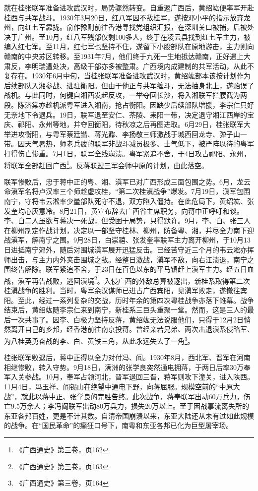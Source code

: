 就在桂张联军准备进攻武汉时，局势骤然转变。自重返广西后，黄绍竑便率军开赴桂西与共军战斗。1930年3月20日，红八军因不敌桂军，遂按邓小平的指示放弃龙州，向红七军靠拢。俞作豫则前往香港寻找党组织汇报，在深圳关口被捕，后被处决于广州。至10月，红八军残部仅剩100多人，终于在凌云县找到红七军主力，被编入红七军。至11月，红七军也坚持不住，遂留下小股部队在原地游击，主力则向赣南的中央苏区转移。至1931年7月，他们终于九死一生地抵达赣南，正好遇上大肃反，李明瑞遭处决，高级干部亦多被整肃。广西境内成建制的共军活动，从此不复存在。1930年6月中旬，当桂张联军准备进攻武汉时，黄绍竑部本该按计划作为后续部队入湘参战、进驻衡阳。但由于他正与共军缠斗，无法抽身北上，遂贻误了战机。与此同时，何键自湘西发起反攻，一举夺回长沙，将入湘联军拦腰截为两段。陈济棠亦趁机派粤军进入湘南，抢占衡阳。因缺少后续部队增援，李宗仁只好无奈地下令退兵。19日，联军退至安仁、茶陵、耒阳一带，决定退守湘江西岸的宝庆、祁阳、永州等地，并夺回衡阳，待秋凉之后再图进取。6月29日，桂张联军大举进攻衡阳，与粤军蔡廷锴、蒋光鼐、李扬敬三师激战于城西回龙寺、弹子山一带。因天气暑热，师老兵疲的联军非战斗减员极多、士气低下，被严阵以待的粤军打得伤亡惨重。7月1日，联军全线崩溃。粤军紧追不舍，于4日攻占祁阳、永州，将联军全部赶回广西\footnote{《广西通史》第三卷，页162}。反蒋联盟三军会师中原的计划，由此落空。

联军惨败后，忠于蒋中正的粤、湘、滇军已对广西形成三面包围之势。6月，龙云命滇军名将卢汉率三个师趁虚攻桂，“第二次桂滇战争”爆发。7月19日，滇军包围南宁，守将韦云淞率少量部队死守不退，双方陷入僵持。在此危局下，黄绍竑、张发奎均心灰意冷。8月21日，黄宣布辞去广西省主席职务，向蒋中正呼吁和谈。李、白二人虽欲与蒋决一死战，但受困于局势，只得默许。9月，李、白、张三人在柳州制定作战计划，决定以一部坚守桂林、柳州，防备粤、湘，并尽全力南下迎战滇军，解南宁之围。9月28日，白崇禧、张发奎率联军主力离开柳州，于10月13日进抵南宁郊外，随后对围城滇军展开迅猛反击。已经苦守近三个月的韦云淞亦挥师出击，与主力内外夹击围城之敌。经整日激战，滇军不敌，向右江溃退，南宁之围终告解除。联军紧追不舍，于23日在百色以东的平马镇赶上滇军主力。经五日血战，滇军再告战败，逃回滇境\footnote{《广西通史》第三卷，页163}。入侵广西的外敌总算被逐出，新桂系取得第二次桂滇战争的胜利。当时，粤军余汉谋师已进占广西宾阳，见滇军败走，遂撤往宾阳。至此，经过一系列复杂的交战，历时年余的第四次粤桂战争亦落下帷幕。战争结束后，黄绍竑随李宗仁来到南宁，新桂系三巨头重聚一堂。然而，这是三人的最后一次共事了。因李、白极力坚持反蒋，黄绍竑无法说服他们，只得于12月2日悄然离开自己的乡邦，经香港前往南京投蒋。曾经亲若兄弟、两次击退滇系侵略军、为八桂英勇奋战的李、白、黄铁三角，从此永远失去了一角\footnote{《广西通史》第三卷，页164}。

桂张联军败退后，蒋中正得以全力对付冯、阎。1930年8月，西北军、晋军在河南相继惨败，转入守势。9月18日，满洲的张学良突然通电拥蒋，于两日后率30万奉军入关参战。10月，奉军占领河北，晋军退回三晋，蒋军则攻下潼关，进入陕西。11月4日，冯玉祥、阎锡山在绝望中通电下野，向蒋屈服。规模空前的“中原大战”，就此以蒋中正、张学良的完胜告终。此次战争，蒋奉联军出动60万兵力，伤亡9.5万余人；李冯阎联军出动80万兵力，损失20万以上。至于因战事流离失所的东亚各邦百姓，更是不计其数。自清帝国崩溃以来，东亚大陆还从未有过如此规模的战争。在“国民革命”的癫狂口号下，南粤和东亚各邦已化为巨型屠宰场。


